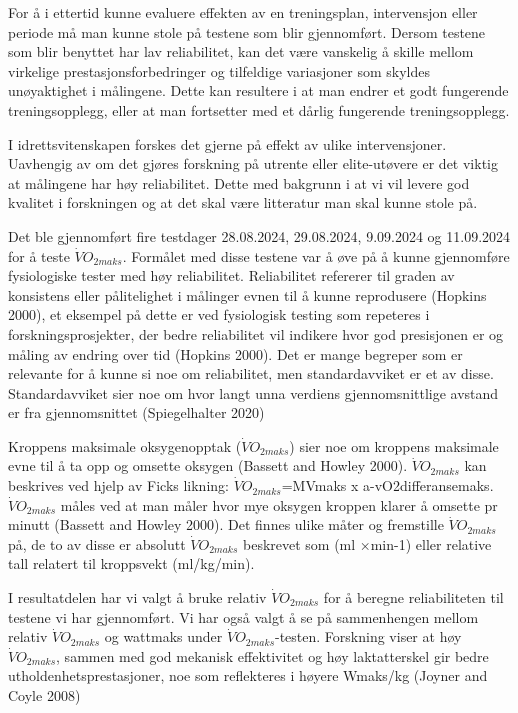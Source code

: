 \documentclass[
  letterpaper,
  DIV=11,
  numbers=noendperiod]{scrreprt}
\begin{document}
For å i ettertid kunne evaluere effekten av en treningsplan,
intervensjon eller periode må man kunne stole på testene som blir
gjennomført. Dersom testene som blir benyttet har lav reliabilitet, kan
det være vanskelig å skille mellom virkelige prestasjonsforbedringer og
tilfeldige variasjoner som skyldes unøyaktighet i målingene. Dette kan
resultere i at man endrer et godt fungerende treningsopplegg, eller at
man fortsetter med et dårlig fungerende treningsopplegg.

I idrettsvitenskapen forskes det gjerne på effekt av ulike
intervensjoner. Uavhengig av om det gjøres forskning på utrente eller
elite-utøvere er det viktig at målingene har høy reliabilitet. Dette med
bakgrunn i at vi vil levere god kvalitet i forskningen og at det skal
være litteratur man skal kunne stole på.

Det ble gjennomført fire testdager 28.08.2024, 29.08.2024, 9.09.2024 og
11.09.2024 for å teste \(\dot{V}O_{2maks}\). Formålet med disse testene
var å øve på å kunne gjennomføre fysiologiske tester med høy
reliabilitet. Reliabilitet refererer til graden av konsistens eller
pålitelighet i målinger evnen til å kunne reprodusere (Hopkins 2000), et
eksempel på dette er ved fysiologisk testing som repeteres i
forskningsprosjekter, der bedre reliabilitet vil indikere hvor god
presisjonen er og måling av endring over tid (Hopkins 2000). Det er
mange begreper som er relevante for å kunne si noe om reliabilitet, men
standardavviket er et av disse. Standardavviket sier noe om hvor langt
unna verdiens gjennomsnittlige avstand er fra gjennomsnittet
(Spiegelhalter 2020)

Kroppens maksimale oksygenopptak (\(\dot{V}O_{2maks}\)) sier noe om
kroppens maksimale evne til å ta opp og omsette oksygen (Bassett and
Howley 2000). \(\dot{V}O_{2maks}\) kan beskrives ved hjelp av Ficks
likning: \(\dot{V}O_{2maks}\)=MVmaks x a-vO2differansemaks.
\(\dot{V}O_{2maks}\) måles ved at man måler hvor mye oksygen kroppen
klarer å omsette pr minutt (Bassett and Howley 2000). Det finnes ulike
måter og fremstille \(\dot{V}O_{2maks}\) på, de to av disse er absolutt
\(\dot{V}O_{2maks}\) beskrevet som (ml ×min-1) eller relative tall
relatert til kroppsvekt (ml/kg/min).

I resultatdelen har vi valgt å bruke relativ \(\dot{V}O_{2maks}\) for å
beregne reliabiliteten til testene vi har gjennomført. Vi har også valgt
å se på sammenhengen mellom relativ \(\dot{V}O_{2maks}\) og wattmaks
under \(\dot{V}O_{2maks}\)-testen. Forskning viser at høy
\(\dot{V}O_{2maks}\), sammen med god mekanisk effektivitet og høy
laktatterskel gir bedre utholdenhetsprestasjoner, noe som reflekteres i
høyere Wmaks/kg (Joyner and Coyle 2008)
\end{document}
